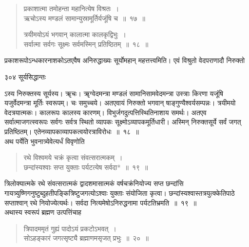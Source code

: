 \documentclass[11pt, openany]{book}
\begin{document}
\begin{quote}
{\ssi प्रकाशात्मा तमोहन्ता महानित्येष विश्रतः~।\\
ऋचोऽस्य मण्डलं सामान्युस्रामूर्तिर्यजूंषि च~॥~१७~॥

त्रयीमयोऽयं भगवान् कालात्मा कालकृद्विभुः~।\\
सर्वात्मा सर्वगः सूक्ष्मः सर्वमस्मिन् प्रतिष्ठितम्~॥~१८~॥ }
\end{quote}
 प्रकाशरूपोऽन्धकारनाशकोऽतएवैष अनिरुद्धाख्यः सूर्योमहान् महत्तत्त्वमिति। एवं विश्रुतो वेदपराणादौ निरुक्तो \textendash



\newpage


\noindent ३०४ \hspace{4cm} सूर्यसिद्धान्तः
\vspace{1cm}


\noindent ऽस्य निरुक्तस्य सूर्यस्य। ॠचः। ॠग्वेदमन्त्रा मण्डलं सामानिसामवेदमन्त्रा उस्त्राः किरणा यजूंषि यजुर्वेदमन्त्रा मूर्तिः स्वरूपम्। चः समुच्चये। अतएवायं निरुक्तो भगवान् षाङ्गुण्यैश्वर्यसम्पन्नः। त्रयीमयो वेदत्रयात्मकः। कालरूपः कालस्य कारणम्। विभुर्जगदुत्पत्तिस्थितिनाशाय समर्थः। अतएव सर्वात्माजगत्स्वरूपः सर्वगः सर्वत्र स्थितो व्यापकः सूक्ष्मोऽव्यापकमूर्तिधारी। अस्मिन् निरुक्तसूर्ये सर्वं जगत् प्रतिष्ठितम्। एतेनव्यापकाव्यापकत्वयोरत्राविरोधः~॥~१८~॥\\
\noindent अथ पर्येति भुवनात्र्येवेत्यर्धं विवृणोति \textendash

\begin{quote}
{\ssi रथे विश्वमये चक्रं कृत्वा संवत्सरात्मकम्~।\\ 
छन्दांस्यश्वाः सप्त युक्ताः पर्यटत्येष सर्वदा*~॥~१९~॥ }
\end{quote}

 त्रिलोक्यात्मके रथे संवत्सरात्मकं द्वादशमासात्मकं वर्षचक्रंनियोज्य सप्त छन्दांसि गायत्र्युष्णिगनुष्टुब्दुहतीपङ्कित्रिष्टुजगत्योऽश्वाः युक्ताः संयोजिता कृत्वा। छन्दांस्यश्वास्तत्रयुत्क्केतिपाठे सप्ताश्वान् रथे नियोज्येत्यर्थः। सर्वदा नित्यमेषोऽनिरुद्धनामा पर्यटतिभ्रमति~॥~१९~॥\\
\noindent अथास्य स्वरूपं ब्रह्मण उत्पत्तिंचाह \textendash 

\begin{quote}
{\ssi त्रिपादममृतं गुह्यं पादोऽयं प्रकटोऽभवत्~।\\ 
सोऽहङ्कारं जगत्सृष्ट्यै ब्रह्माणमसृजत् प्रभुः~॥~२०~॥}
\end{quote}
\end{document}
